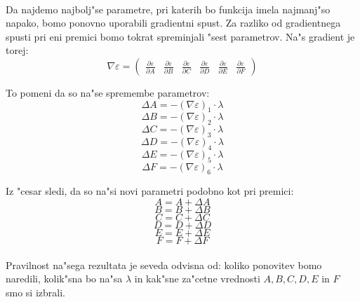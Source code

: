 \paragraph{}
Da najdemo najbolj"se parametre, pri katerih bo funkcija imela najmanj"so napako, bomo ponovno uporabili gradientni spust. Za razliko od gradientnega spusti pri eni premici bomo tokrat spreminjali "sest parametrov. Na"s gradient je torej:
$$\nabla \varepsilon = \begin{pmatrix}
\frac{\partial \varepsilon}{\partial A} &
\frac{\partial \varepsilon}{\partial B} &
\frac{\partial \varepsilon}{\partial C} &
\frac{\partial \varepsilon}{\partial D} &
\frac{\partial \varepsilon}{\partial E} &
\frac{\partial \varepsilon}{\partial F}
\end{pmatrix}$$

To pomeni da so na"se spremembe parametrov:
$$\Delta A = -(\nabla \varepsilon)_1 \cdot \lambda$$
$$\Delta B = -(\nabla \varepsilon)_2 \cdot \lambda$$
$$\Delta C = -(\nabla \varepsilon)_3 \cdot \lambda$$
$$\Delta D = -(\nabla \varepsilon)_4 \cdot \lambda$$
$$\Delta E = -(\nabla \varepsilon)_5 \cdot \lambda$$
$$\Delta F = -(\nabla \varepsilon)_6 \cdot \lambda$$

Iz "cesar sledi, da so na"si novi parametri podobno kot pri premici:
$$A = A + \Delta A$$
$$B = B + \Delta B$$
$$C = C + \Delta C$$
$$D = D + \Delta D$$
$$E = E + \Delta E$$
$$F = F + \Delta F$$

\paragraph{}Pravilnost na"sega rezultata je seveda odvisna od: koliko ponovitev bomo naredili, kolik"sna bo na"sa $\lambda$ in kak"sne za"cetne vrednosti $A, B, C, D, E$ in $F$ smo si izbrali.
